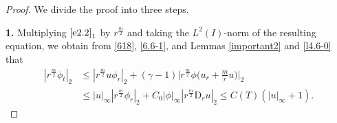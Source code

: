 \documentclass[11pt,reqno]{amsart}
\numberwithin{rk}{section}
\numberwithin{prop}{section}
\numberwithin{mydef}{section}
\numberwithin{lem}{section}
\numberwithin{equation}{section}
\numberwithin{thm}{section}
\begin{document}
\begin{proof} We divide the proof into three steps.

\smallskip 
\textbf{1.} Multiplying $\eqref{e2.2}_1$ by $r^\frac{m}{2}$ and taking the $L^2(I)$-norm of the resulting equation, we obtain from \eqref{618}, \eqref{6.6-1}, and Lemmas \ref{important2} and \ref{l4.6-0} that 
\begin{equation}\label{6.6-2}
\begin{aligned}
|r^{\frac{m}{2}}\phi_t|_2&\leq  |r^{\frac{m}{2}}u\phi_r|_2+(\gamma-1)\Big|r^\frac{m}{2}\phi(u_r+\frac{m}{r}u\big)\Big|_2\\
&\leq |u|_\infty|r^{\frac{m}{2}}\phi_r|_2+C_0|\phi|_\infty |r^{\frac{m}{2}}\mathrm{D}_r u|_2 \leq C(T)(|u|_\infty+1).
\end{aligned}    
\end{equation} 


\end{proof}
\end{document}
